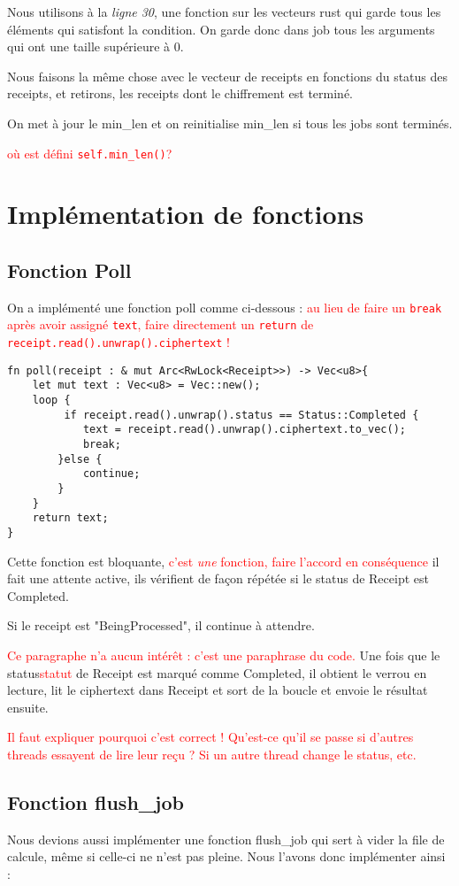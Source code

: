 \documentclass{article}
\newcommand{\TODO}[1]{\textcolor{red}{#1}}
\begin{document}
Nous utilisons à la \textit{ligne 30}, une fonction sur les vecteurs rust qui garde tous les éléments qui satisfont  la condition. On garde donc dans job tous les arguments qui ont une taille supérieure à 0.

Nous faisons la même chose avec le vecteur de receipts en fonctions du status des receipts, et retirons, les receipts dont le chiffrement est terminé.

On met à jour le min\_len et on reinitialise min\_len si tous les jobs sont terminés.

\TODO{où est défini \lstinline!self.min_len()!?}

\section{Implémentation de fonctions}
\subsection{Fonction Poll}
On a implémenté une fonction poll comme ci-dessous :
\TODO{au lieu de faire un \lstinline!break! après avoir assigné \lstinline!text!, faire directement un \lstinline!return! de \lstinline!receipt.read().unwrap().ciphertext! !}
\begin{lstlisting}
fn poll(receipt : & mut Arc<RwLock<Receipt>>) -> Vec<u8>{
    let mut text : Vec<u8> = Vec::new();
    loop {
         if receipt.read().unwrap().status == Status::Completed {
            text = receipt.read().unwrap().ciphertext.to_vec();
            break;
        }else {
            continue;
        }
    }
    return text;
}\end{lstlisting}
Cette fonction est bloquante, \TODO{c'est \emph{une} fonction, faire l'accord en conséquence} il fait une attente active, ils vérifient de façon répétée si le status de Receipt est Completed.

Si le receipt est "BeingProcessed", il continue à attendre.

\TODO{Ce paragraphe n'a aucun intérêt : c'est une paraphrase du code.} Une fois que le status\TODO{statut} de Receipt est marqué comme Completed, il obtient le verrou en lecture, lit le ciphertext dans Receipt et sort de la boucle et envoie le résultat ensuite.

\TODO{Il faut expliquer pourquoi c'est correct ! Qu'est-ce qu'il se passe si d'autres threads essayent de lire leur reçu ? Si un autre thread change le status, etc.}

\subsection{Fonction flush\_job}
Nous devions aussi implémenter une fonction flush\_job qui sert à vider la file de calcule, même si celle-ci ne n'est pas pleine. Nous l'avons donc implémenter ainsi :
\end{document}
